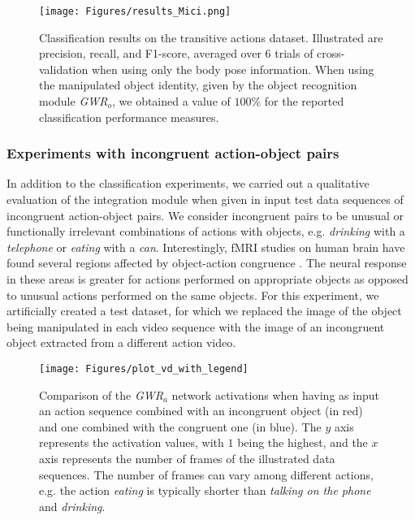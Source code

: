 \documentclass[5p,times]{elsarticle}
\begin{document}
\begin{figure}
\centering
\texttt{[image: Figures/results\_Mici.png]}
\caption{Classification results on the transitive actions dataset. Illustrated are precision, recall, and F1-score, averaged over 6 trials of cross-validation when using only the body pose information. When using the manipulated object identity, given by the object recognition module \textit{GWR}$_o$, we obtained a value of $100\%$ for the reported classification performance measures.}
\label{fig:results_mici}
\end{figure}

\subsubsection{Experiments with incongruent action-object pairs}
In addition to the classification experiments, we carried out a qualitative evaluation of the integration module when given in input test data sequences of incongruent action-object pairs.
We consider incongruent pairs to be unusual or functionally irrelevant combinations of actions with objects, e.g. \textit{drinking} with a \textit{telephone} or \textit{eating} with a \textit{can}. 
Interestingly, fMRI studies on human brain have found several regions affected by object-action congruence \citep{yoon2012neural}. 
The neural response in these areas is greater for actions performed on appropriate objects as opposed to unusual actions performed on the same objects.
For this experiment, we artificially created a test dataset, for which we replaced the image of the object being manipulated in each video sequence with the image of an incongruent object extracted from a different action video.

\begin{figure}
\begin{center}
\texttt{[image: Figures/plot\_vd\_with\_legend]}
\end{center}
\caption{Comparison of the \textit{GWR}$_a$ network activations when having as input an action sequence combined with an incongruent object (in red) and one combined with the congruent one (in blue). The $y$ axis represents the activation values, with $1$ being the highest, and the $x$ axis represents the number of frames of the illustrated data sequences. The number of frames can vary among different actions, e.g. the action \textit{eating} is typically shorter than \textit{talking on the phone} and \textit{drinking}.}
\label{fig:plots}
\end{figure}
\end{document}
